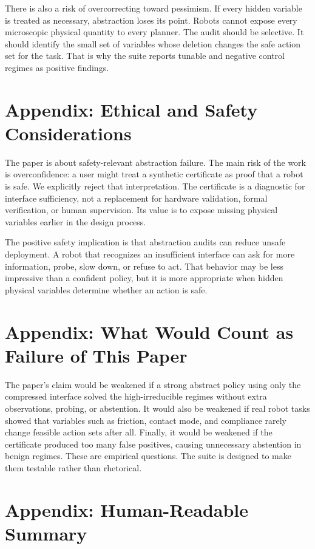 \documentclass{article}
\begin{document}
There is also a risk of overcorrecting toward pessimism. If every hidden variable
is treated as necessary, abstraction loses its point. Robots cannot expose every
microscopic physical quantity to every planner. The audit should be selective.
It should identify the small set of variables whose deletion changes the safe
action set for the task. That is why the suite reports tunable and negative
control regimes as positive findings.

\section{Appendix: Ethical and Safety Considerations}

The paper is about safety-relevant abstraction failure. The main risk of the
work is overconfidence: a user might treat a synthetic certificate as proof that
a robot is safe. We explicitly reject that interpretation. The certificate is a
diagnostic for interface sufficiency, not a replacement for hardware validation,
formal verification, or human supervision. Its value is to expose missing
physical variables earlier in the design process.

The positive safety implication is that abstraction audits can reduce unsafe
deployment. A robot that recognizes an insufficient interface can ask for more
information, probe, slow down, or refuse to act. That behavior may be less
impressive than a confident policy, but it is more appropriate when hidden
physical variables determine whether an action is safe.

\section{Appendix: What Would Count as Failure of This Paper}

The paper's claim would be weakened if a strong abstract policy using only the
compressed interface solved the high-irreducible regimes without extra
observations, probing, or abstention. It would also be weakened if real robot
tasks showed that variables such as friction, contact mode, and compliance rarely
change feasible action sets after all. Finally, it would be weakened if the
certificate produced too many false positives, causing unnecessary abstention in
benign regimes. These are empirical questions. The suite is designed to make them
testable rather than rhetorical.

\section{Appendix: Human-Readable Summary}
\end{document}
